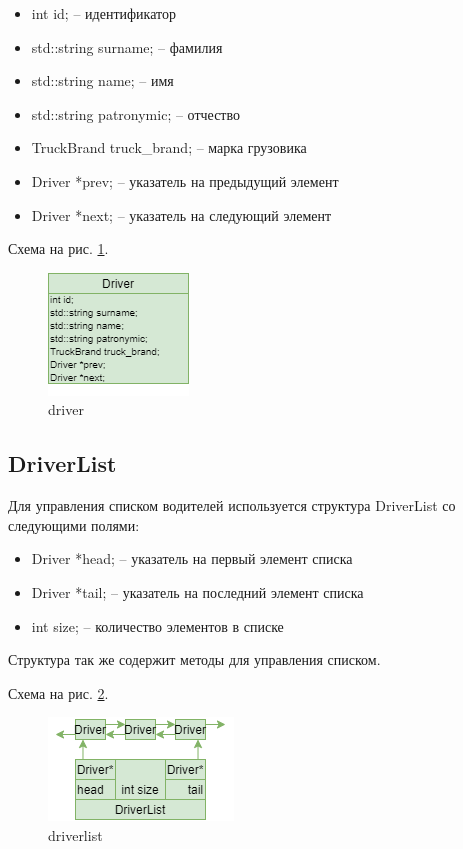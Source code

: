 \begin{itemize}
    \item int id; -- идентификатор
    \item std::string surname; -- фамилия 
    \item std::string name; -- имя
    \item std::string patronymic; -- отчество
    \item TruckBrand truck\_brand; -- марка грузовика
    \item Driver *prev; -- указатель на предыдущий элемент
    \item Driver *next; -- указатель на следующий элемент
\end{itemize}

Схема на рис. \ref{driver}.

\begin{figure}[hpt!]
    \centering
    \includegraphics[width=0.4\linewidth]{photo/driver}
    \caption{driver}
    \label{driver}
\end{figure}

\subsection{DriverList}

Для управления списком водителей используется структура DriverList со следующими полями:

\begin{itemize}
    \item Driver *head; -- указатель на первый элемент списка
    \item Driver *tail; -- указатель на последний элемент списка
    \item int size; -- количество элементов в списке
\end{itemize}

Структура так же содержит методы для управления списком.

Схема на рис. \ref{driver_list}.

\begin{figure}[H]
    \centering
    \includegraphics[width=0.4\linewidth]{photo/driver_list}
    \caption{driverlist}
    \label{driver_list}
\end{figure}

